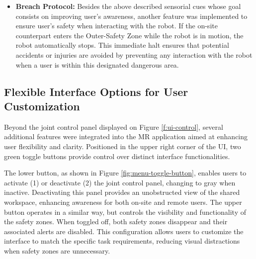 \begin{itemize}
\item \textbf{Breach Protocol:} Besides the above described sensorial cues whose goal consists on improving user's awareness, another feature was implemented to ensure user's safety when interacting with the robot. If the on-site counterpart enters the Outer-Safety Zone while the robot is in motion, the robot automatically stops. This immediate halt ensures that potential accidents or injuries are avoided by preventing any interaction with the robot when a user is within this designated dangerous area.
\end{itemize}
    
\subsection{Flexible Interface Options for User Customization}


Beyond the joint control panel displayed on Figure \ref{f:ui-control}, several additional features were integrated into the \ac{MR} application aimed at enhancing user flexibility and clarity. Positioned in the upper right corner of the \ac{UI}, two green toggle buttons provide control over distinct interface functionalities.

The lower button, as shown in Figure \ref{fig:menu-toggle-button}, enables users to activate (1) or deactivate (2) the joint control panel, changing to gray when inactive. Deactivating this panel provides an unobstructed view of the shared workspace, enhancing awareness for both on-site and remote users. The upper button operates in a similar way, but controls the visibility and functionality of the safety zones. When toggled off, both safety zones disappear and their associated alerts are disabled. This configuration allows users to customize the interface to match the specific task requirements, reducing visual distractions when safety zones are unnecessary.

